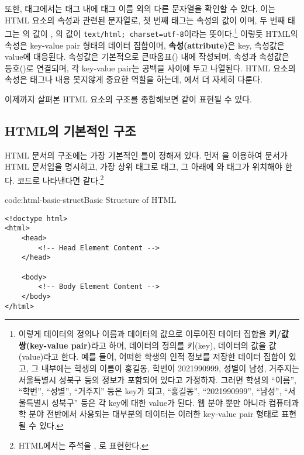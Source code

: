 또한,  태그에서는 태그 내에 태그 이름 외의 다른 문자열을 확인할 수 있다. 이는 HTML 요소의 속성과 관련된 문자열로, 첫 번째  태그는  속성의 값이 이며, 두 번째  태그는 의 값이 , 의 값이 \verb|text/html; charset=utf-8|이라는 뜻이다.\footnote{이렇게 데이터의 정의나 이름과 데이터의 값으로 이루어진 데이터 집합을 \textbf{키/값 쌍(key-value pair)}라고 하며, 데이터의 정의를 키(key), 데이터의 값을 값(value)라고 한다. 예를 들어, 어떠한 학생의 인적 정보를 저장한 데이터 집합이 있고, 그 내부에는 학생의 이름이 홍길동, 학번이 2021990999, 성별이 남성, 거주지는 서울특별시 성북구 등의 정보가 포함되어 있다고 가정하자. 그러면 학생의 ``이름'', ``학번'', ``성별'', ``거주지'' 등은 key가 되고, ``홍길동'', ``2021990999'', ``남성'', ``서울특별시 성북구'' 등은 각 key에 대한 value가 된다. 웹 분야 뿐만 아니라 컴퓨터과학 분야 전반에서 사용되는 대부분의 데이터는 이러한 key-value pair 형태로 표현될 수 있다.} 이렇듯 HTML의 속성은 key-value pair 형태의 데이터 집합이며, \textbf{속성(attribute)}은 key, 속성값은 value에 대응된다. 속성값은 기본적으로 큰따옴표() 내에 작성되며, 속성과 속성값은 등호(\cd{=})로 연결되며, 각 key-value pair는 공백을 사이에 두고 나열된다. HTML 요소의 속성은 태그나 내용 못지않게 중요한 역할을 하는데, 에서 더 자세히 다룬다.

이제까지 살펴본 HTML 요소의 구조를 종합해보면 \와 같이 표현될 수 있다.

    {}

\subsection*{HTML의 기본적인 구조}
HTML 문서의 구조에는 가장 기본적인 틀이 정해져 있다. 먼저 을 이용하여 문서가 HTML 문서임을 명시히고, 가장 상위 태그로  태그, 그 아래에 와  태그가 위치해야 한다. 코드로 나타낸다면 \와 같다.\footnote{HTML에서는 주석을 \cd{<!--}, \cd{-->}로 표현한다.}

\begin{codeenv}{code:html-basic-struct}{Basic Structure of HTML}
\begin{verbatim}
<!doctype html>
<html>
    <head>
        <!-- Head Element Content -->
    </head>

    <body>
        <!-- Body Element Content -->
    </body>
</html>
\end{verbatim}
\end{codeenv}

